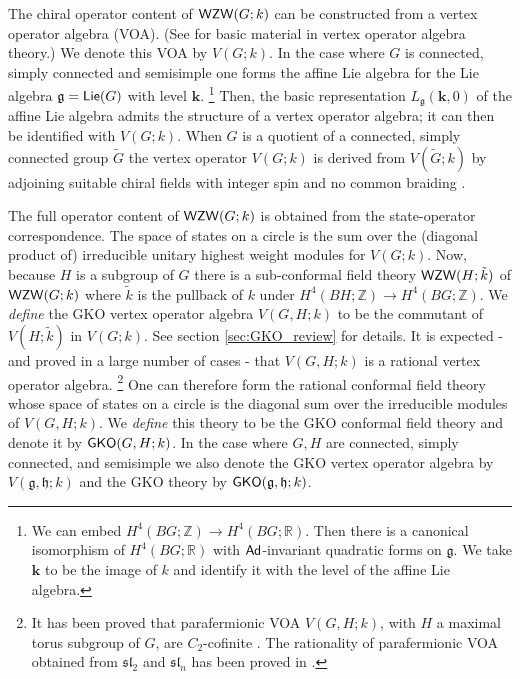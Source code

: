 \documentclass[a4paper,11pt]{article}
\newcommand{\bk}{\bm{k}}
\newcommand{\tsf}[1]{\textsf{#1}}
\def\IR{{\mathbb{R}}}
\def\IZ{{\mathds{Z}}}
\def\fg{\mathfrak{g}}
\def\fh{\mathfrak{h}}
\def\fl{\mathfrak{l}}
\def\fs{\mathfrak{s}}
\def\fs{\mathfrak{s}}
\begin{document}
The chiral operator content of $\mathsf{WZW}(G;k)$ can be constructed from a vertex operator algebra (\tsf{VOA}).
(See \cite{FLM1988,frenkel1993axiomatic,lepowsky2012introduction} for basic material in vertex operator algebra theory.)
We denote this \tsf{VOA}  by $V(G;k)$. 
In the case where $G$ is connected, simply connected and semisimple one forms the affine Lie algebra for the  Lie algebra $\fg = \mr{Lie}(G)$ with level $\bk$. 
%
\footnote{We can embed $H^4(BG;\IZ) \rightarrow H^4(BG;\IR)$. Then there is a canonical isomorphism of $H^4(BG;\IR)$ with $\mathsf{Ad}$-invariant quadratic forms on $\fg$. We take $\bk$ to be the image of $k$ and identify it with the level of the affine Lie algebra. }
%
Then, the basic representation $L_{\fg}(\bk,0)$ of the affine Lie algebra admits the structure of a vertex operator algebra; it can then be identified with  $V(G;k)$. When $G$ is a quotient of a connected, simply connected  group $\tilde G$ the vertex operator $V(G;k)$ is derived from $V(\tilde G;k)$ by adjoining suitable chiral fields with integer spin and no common braiding \cite{Moore:1988ss,Moore:1989yh}.

The full operator content of $\mathsf{WZW}(G;k)$ is obtained from the state-operator correspondence. The space of states on a circle is the sum over the (diagonal product of) irreducible unitary highest weight modules for $V(G;k)$. Now, because $H$ is a subgroup of $G$ there is a sub-conformal field theory 
$\mathsf{WZW}(H;\tilde k)$ of $\mathsf{WZW}(G;k)$ where $\tilde k$ is the pullback of $k$ under 
$H^4(BH;\IZ) \to H^4(BG;\IZ)$. We \emph{define} the \tsf{GKO} vertex operator algebra 
$V(G,H;k)$ to be the commutant of $V(H;\tilde k)$ in $V(G;k)$. See section \ref{sec:GKO_review} for details. It is expected - and proved in a large number of cases - that $V(G,H;k)$ is a rational vertex operator algebra.
%
\footnote{It has been proved that parafermionic \tsf{VOA} $V(G,H;k)$, with $H$ a maximal torus subgroup of $G$, are $C_2$-cofinite \cite{ALY1,DW2}. The rationality of parafermionic \tsf{VOA} obtained from $\fs\fl_2$ and $\fs\fl_n$ has been proved in \cite{ALY2,JL1,JL2}. } 
One can therefore form the rational conformal field theory whose space of states on a circle 
is the diagonal sum over the irreducible modules of $V(G,H;k)$. We \emph{define} this theory to 
be the \tsf{GKO} conformal field theory and denote it by $\mathsf{GKO}(G,H;k)$. In the case where $G,H$ are connected, simply connected, and semisimple we also denote the \tsf{GKO} vertex operator algebra by $V(\fg,\fh;k)$ and the \tsf{GKO} theory 
by  $\mr{GKO}(\fg,\fh;k)$. 
\end{document}
